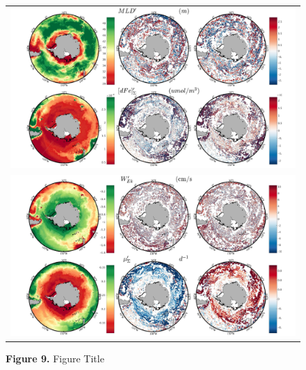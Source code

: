 \begin{figure}[!htbp]
 \centering
 \begin{adjustwidth}{-1in}{0in}
  \begin{tabular}{c }
        \includegraphics[scale=.6]{Fig9/Not_Smoothed/Fig9a_s.pdf} \\
        \includegraphics[scale=.6]{Fig9/Not_Smoothed/Fig9b_s.pdf} \\
    
  \end{tabular}
 \end{adjustwidth}
\caption[Figure Title]
{\textbf{Figure 9.} Figure Title
}
\label{fig:Fig9}
\end{figure}



